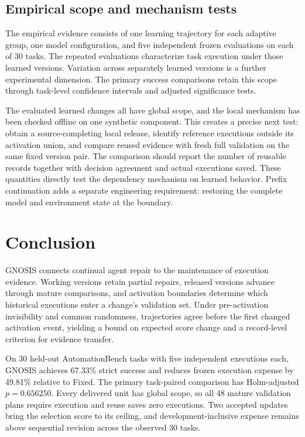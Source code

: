 \documentclass{ecai}
\begin{document}
\subsection{Empirical scope and mechanism tests}

The empirical evidence consists of one learning trajectory for each adaptive group, one model configuration, and five independent frozen evaluations on each of 30 tasks. The repeated evaluations characterize task execution under those learned versions. Variation across separately learned versions is a further experimental dimension. The primary success comparisons retain this scope through task-level confidence intervals and adjusted significance tests.

The evaluated learned changes all have global scope, and the local mechanism has been checked offline on one synthetic component. This creates a precise next test: obtain a source-completing local release, identify reference executions outside its activation union, and compare reused evidence with fresh full validation on the same fixed version pair. The comparison should report the number of reusable records together with decision agreement and actual executions saved. These quantities directly test the dependency mechanism on learned behavior. Prefix continuation adds a separate engineering requirement: restoring the complete model and environment state at the boundary.

\section{Conclusion}

GNOSIS connects continual agent repair to the maintenance of execution evidence. Working versions retain partial repairs, released versions advance through mature comparisons, and activation boundaries determine which historical executions enter a change's validation set. Under pre-activation invisibility and common randomness, trajectories agree before the first changed activation event, yielding a bound on expected score change and a record-level criterion for evidence transfer.

On 30 held-out AutomationBench tasks with five independent executions each, GNOSIS achieves 67.33\% strict success and reduces frozen execution expense by 49.81\% relative to Fixed. The primary task-paired comparison has Holm-adjusted $p=0.656250$. Every delivered unit has global scope, so all 48 mature validation plans require execution and reuse saves zero executions. Two accepted updates bring the selection score to its ceiling, and development-inclusive expense remains above sequential revision across the observed 30 tasks.
\end{document}
